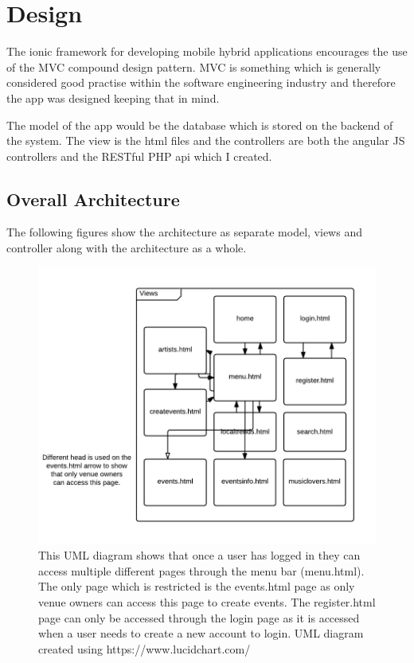 \chapter{Design}
The ionic framework for developing mobile hybrid applications encourages the use of the MVC compound design pattern. MVC is something which is generally considered good practise within the software engineering industry and therefore the app was designed keeping that in mind.

The model of the app would be the database which is stored on the backend of the system. The view is the html files and the controllers are both the angular JS controllers and the RESTful PHP api which I created.




\section{Overall Architecture}
The following figures show the architecture as separate model, views and controller along with the architecture as a whole. 
\begin{figure}[H]
\includegraphics[width=\textwidth,height=\textheight,keepaspectratio]{images/va}
\caption{This UML diagram shows that once a user has logged in they can access multiple different pages through the menu bar (menu.html). The only page which is restricted is the events.html page as only venue owners can access this page to create events. The register.html page can only be accessed through the login page as it is accessed when a user needs to create a new account to login. UML diagram created using https://www.lucidchart.com/}
\end{figure}

